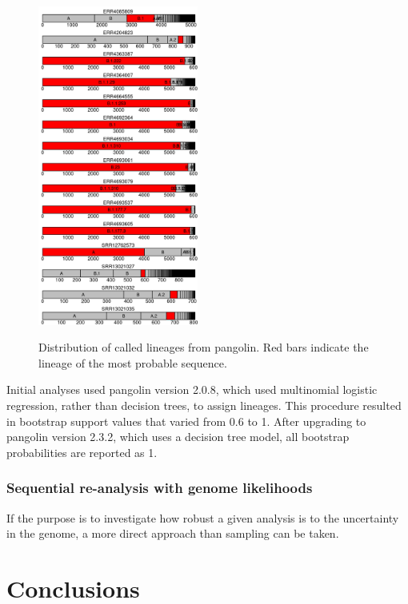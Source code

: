 \documentclass[
]{article}
\begin{document}
\begin{figure}
\includegraphics[width = 0.47\textwidth]{../figures/stacked-lineages.png}
\label{fig:covidcalls}
\caption{Distribution of called lineages from pangolin. Red bars indicate the lineage of the most probable sequence.}
\end{figure}

Initial analyses used pangolin version 2.0.8, which used multinomial
logistic regression, rather than decision trees, to assign lineages.
This procedure resulted in bootstrap support values that varied from 0.6
to 1. After upgrading to pangolin version 2.3.2, which uses a decision
tree model, all bootstrap probabilities are reported as 1.

\hypertarget{sequential-re-analysis-with-genome-likelihoods}{%
\subsubsection{Sequential re-analysis with genome
likelihoods}\label{sequential-re-analysis-with-genome-likelihoods}}

If the purpose is to investigate how robust a given analysis is to the
uncertainty in the genome, a more direct approach than sampling can be
taken.

\hypertarget{conclusions}{%
\section{Conclusions}\label{conclusions}}
\end{document}
